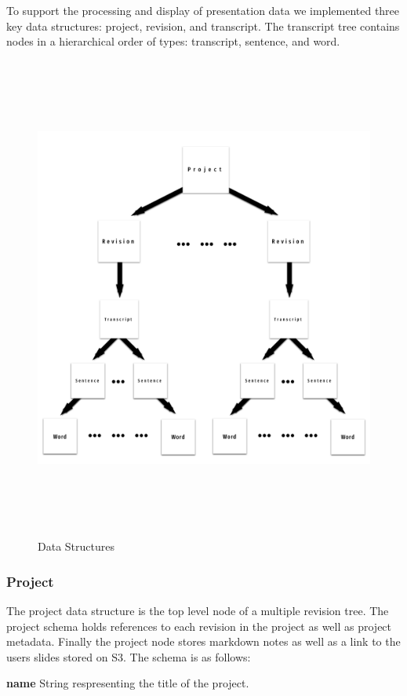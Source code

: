 To support the processing and display of presentation data we implemented three
key data structures: project, revision, and transcript. The transcript tree
contains nodes in a hierarchical order of types: transcript, sentence, and word.

\begin{figure}[H]
  \centering
   \includegraphics[height=6.3in]{figures/datastructures}
   \caption{Data Structures}
\end{figure}

\subsubsection*{Project}

The project data structure is the top level node of a multiple revision tree.
The project schema holds references to each revision in the project as well as
project metadata. Finally the project node stores markdown notes as well as a
link to the users slides stored on S3. The schema is as follows:

\textbf{name} String respresenting the title of the project.


